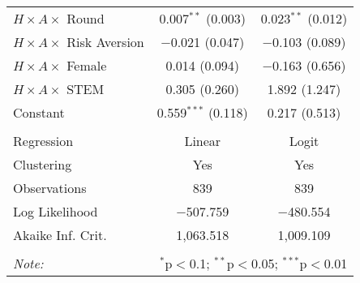 \begin{tabular}{@{\extracolsep{5pt}}lcc}
  $H\times A\times$ Round & 0.007$^{**}$ (0.003) & 0.023$^{**}$ (0.012) \\ 
  $H\times A\times$ Risk Aversion & $-$0.021 (0.047) & $-$0.103 (0.089) \\ 
  $H\times A\times$ Female & 0.014 (0.094) & $-$0.163 (0.656) \\ 
  $H\times A\times$ STEM & 0.305 (0.260) & 1.892 (1.247) \\ 
  Constant & 0.559$^{***}$ (0.118) & 0.217 (0.513) \\ 
 \hline \\[-1.8ex] 
Regression & Linear & Logit \\ 
Clustering & Yes & Yes \\ 
Observations & 839 & 839 \\ 
Log Likelihood & $-$507.759 & $-$480.554 \\ 
Akaike Inf. Crit. & 1,063.518 & 1,009.109 \\ 
\hline 
\hline \\[-1.8ex] 
\textit{Note:}  & \multicolumn{2}{r}{$^{*}$p$<$0.1; $^{**}$p$<$0.05; $^{***}$p$<$0.01} \\ 
\end{tabular} 
